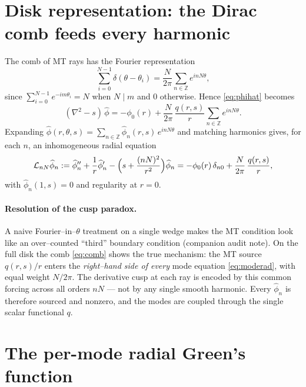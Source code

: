 \documentclass{article}
\newcommand{\Lap}{\mathcal{L}}
\begin{document}
\section{Disk representation: the Dirac comb feeds every harmonic}

The comb of MT rays has the Fourier representation
\begin{equation}
\sum_{i=0}^{N-1}\delta(\theta-\theta_i)
=\frac{N}{2\pi}\sum_{n\in\mathbb Z}e^{inN\theta},
\label{eq:comb}
\end{equation}
since $\sum_{i=0}^{N-1}e^{-im\theta_i}=N$ when $N\mid m$ and $0$ otherwise. Hence
\eqref{eq:phihat} becomes
\begin{equation}
(\nabla^2-s)\,\widehat\phi
=-\phi_0(r)+\frac{N}{2\pi}\,\frac{q(r,s)}{r}\sum_{n\in\mathbb Z}e^{inN\theta}.
\label{eq:phihat2}
\end{equation}
Expanding $\widehat\phi(r,\theta,s)=\sum_{n\in\mathbb Z}\widehat\phi_n(r,s)\,e^{inN\theta}$
and matching harmonics gives, for each $n$, an inhomogeneous radial equation
\begin{equation}
\Lap_{nN}\widehat\phi_n:=
\widehat\phi_n''+\frac1r\widehat\phi_n'
-\Bigl(s+\frac{(nN)^2}{r^2}\Bigr)\widehat\phi_n
=-\phi_0(r)\,\delta_{n0}+\frac{N}{2\pi}\,\frac{q(r,s)}{r},
\label{eq:moderad}
\end{equation}
with $\widehat\phi_n(1,s)=0$ and regularity at $r=0$.

\paragraph{Resolution of the cusp paradox.} A naive Fourier--in--$\theta$
treatment on a single wedge makes the MT condition look like an over--counted
``third'' boundary condition (companion audit note). On the full disk the comb
\eqref{eq:comb} shows the true mechanism: the MT source $q(r,s)/r$ enters the
\emph{right--hand side of every} mode equation \eqref{eq:moderad}, with equal
weight $N/2\pi$. The derivative cusp at each ray is encoded by this common
forcing across all orders $nN$ --- not by any single smooth harmonic. Every
$\widehat\phi_n$ is therefore sourced and nonzero, and the modes are coupled
through the single scalar functional $q$.

\section{The per-mode radial Green's function}
\end{document}
